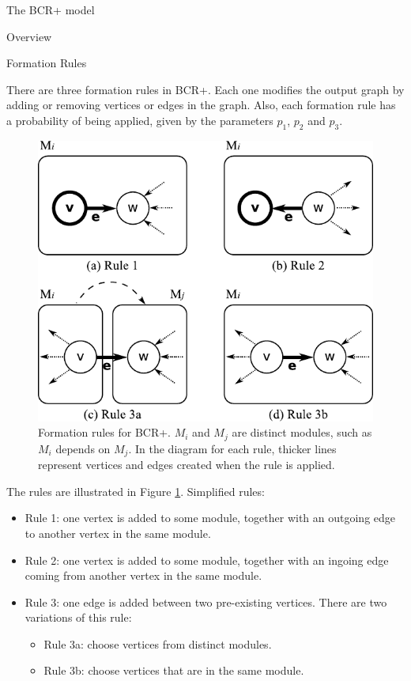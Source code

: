 \documentclass[11pt,twocolumn,a4paper,english]{article}
\begin{document}
\begin{section}{The BCR+ model}
\begin{subsection}{Overview}
\end{subsection}	

\begin{subsection}{Formation Rules}
	
	There are three formation rules in BCR+. Each one modifies the output graph by adding or removing vertices or edges in the graph. Also, each formation rule has a probability of being applied, given by the parameters $p_1$, $p_2$ and $p_3$.

\begin{figure}[htbp]
	\centering
		\includegraphics[scale=1]{figures/bcr-rules}
	\caption{Formation rules for BCR+. $M_i$ and $M_j$ are distinct modules, such as $M_i$ depends on $M_j$. In the diagram for each rule, thicker lines represent vertices and edges created when the rule is applied.}
	\label{fig:bcr-rules}
\end{figure}

	The rules are illustrated in Figure \ref{fig:bcr-rules}. Simplified rules:
	
	\begin{itemize}
		\item Rule 1: one vertex is added to some module, together with an outgoing edge to another vertex in the same module.
		\item Rule 2: one vertex is added to some module, together with an ingoing edge coming from another vertex in the same module.
		\item Rule 3: one edge is added between two pre-existing vertices. There are two variations of this rule:
		\begin{itemize}
			\item Rule 3a: choose vertices from distinct modules.
			\item Rule 3b: choose vertices that are in the same module.
		\end{itemize}
	\end{itemize}
	

\end{subsection}
\end{section}
\end{document}
